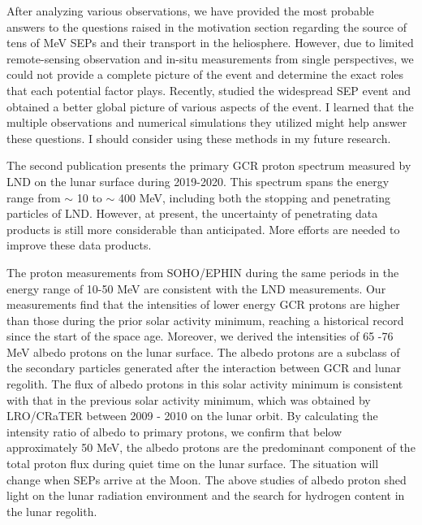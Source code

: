 After analyzing various observations, we have provided the most probable answers to the questions raised in the motivation section regarding the source of tens of MeV \acp{SEP} and their transport in the heliosphere. However, due to limited remote-sensing observation and in-situ measurements from single perspectives, we could not provide a complete picture of the event and determine the exact roles that each potential factor plays. Recently, \citet{dresing202317, Kolhoff2021AA} studied the widespread \ac{SEP} event and obtained a better global picture of various aspects of the event. I learned that the multiple observations and numerical simulations they utilized might help answer these questions. I should consider using these methods in my future research.



The second publication presents the primary \ac{GCR} proton spectrum measured by \ac{LND} on the lunar surface during 2019-2020. This spectrum spans the energy range from $\sim$ 10 to $\sim$ 400 MeV, including both the stopping and penetrating particles of \ac{LND}. However, at present, the uncertainty of penetrating data products is still more considerable than anticipated. More efforts are needed to improve these data products.

The proton measurements from \acs{SOHO}/\acs{EPHIN} during the same periods in the energy range of 10-50 MeV are consistent with the \ac{LND} measurements. Our measurements find that the intensities of lower energy \ac{GCR} protons are higher than those during the prior solar activity minimum, reaching a historical record since the start of the space age. 
Moreover, we derived the intensities of 65 -76 MeV albedo protons on the lunar surface. The albedo protons are a subclass of the secondary particles generated after the interaction between \ac{GCR} and lunar regolith. The flux of albedo protons in this solar activity minimum is consistent with that in the previous solar activity minimum, which was obtained by \acs{LRO}/\acs{CRaTER} between 2009 - 2010 on the lunar orbit. By calculating the intensity ratio of albedo to primary protons, we confirm that below approximately 50 MeV, the albedo protons are the predominant component of the total proton flux during quiet time on the lunar surface. The situation will change when \acp{SEP} arrive at the Moon.
The above studies of albedo proton shed light on the lunar radiation environment and the search for hydrogen content in the lunar regolith.





